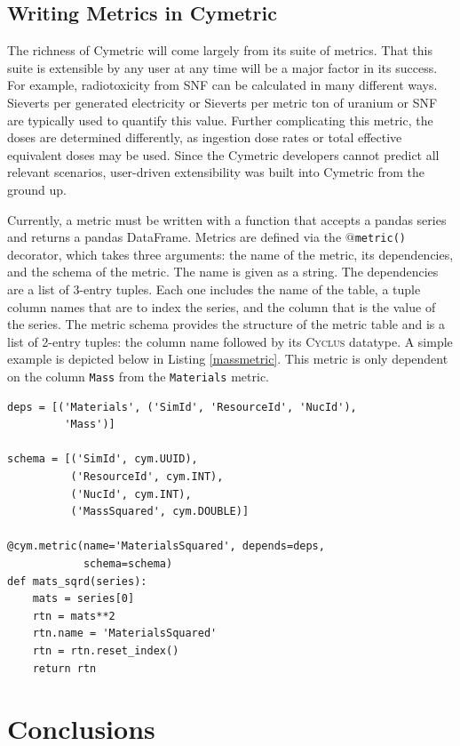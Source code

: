 \documentclass{anstrans}
\newcommand{\cyclus}{\textsc{Cyclus}\xspace}
\newcommand{\code}[1]{{\color{code}\texttt{#1}}}
\begin{document}
\subsection{Writing Metrics in Cymetric}
The richness of Cymetric will come largely from its suite of metrics. 
That this suite is extensible by any user at any time will be a major 
factor in its success. For example, radiotoxicity from \gls{SNF} can 
be calculated in many different ways. Sieverts per generated electricity 
or Sieverts per metric ton of uranium or \gls{SNF} are typically used to 
quantify this value. Further complicating this metric, the doses are determined differently, as 
ingestion dose rates or total effective equivalent doses may be used. 
Since the Cymetric developers cannot predict all relevant scenarios, 
user-driven extensibility was built into Cymetric from the ground up. 

Currently, a metric must be written with a function that accepts a pandas 
series and returns a pandas DataFrame. Metrics are defined via the
\code{$@$metric()} decorator, which takes three arguments: the name of the 
metric, its dependencies, and the schema of the metric. 
The name is given as a string. The dependencies are a list of 3-entry tuples. 
Each one includes the name of the table, a tuple column names that are to 
index the series, and the column that is the value of the series. 
The metric schema provides the structure of the metric table and is a 
list of 2-entry tuples: the column name followed by its \cyclus datatype. 
A simple example is depicted below in Listing \ref{massmetric}. This metric 
is only dependent on the column \code{Mass} from the \code{Materials} metric. 

\begin{lstlisting}[caption ={Writing a Metric in Cymetric}, label=massmetric]
deps = [('Materials', ('SimId', 'ResourceId', 'NucId'), 
         'Mass')]

schema = [('SimId', cym.UUID), 
          ('ResourceId', cym.INT),
          ('NucId', cym.INT),  
          ('MassSquared', cym.DOUBLE)]

@cym.metric(name='MaterialsSquared', depends=deps, 
            schema=schema)
def mats_sqrd(series):
    mats = series[0]
    rtn = mats**2
    rtn.name = 'MaterialsSquared'
    rtn = rtn.reset_index()
    return rtn
\end{lstlisting}


\section{Conclusions}
\end{document}
